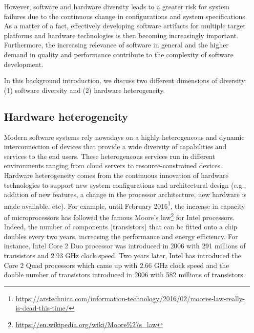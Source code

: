 However, software and hardware diversity leads to a greater risk for system failures due to the continuous change in configurations and system specifications.
As a matter of a fact, effectively developing software artifacts for multiple target platforms and hardware technologies is then becoming increasingly important.
Furthermore, the increasing relevance of software in general and the higher demand in quality and performance contribute to the complexity of software development.

In this background introduction, we discuss two different dimensions of diversity: (1) software diversity and (2) hardware heterogeneity.

 
 
\subsection{Hardware heterogeneity}
Modern software systems rely nowadays on a highly heterogeneous and dynamic interconnection of devices that provide a wide diversity of capabilities and services to the end users.
These heterogeneous services run in different environments ranging from cloud servers to resource-constrained devices.
Hardware heterogeneity comes from the continuous innovation of hardware technologies to support new system configurations and architectural design (e.g., addition of new features, a change in the processor architecture, new hardware is made available, etc). 
For example, until February 2016\footnote{\url{https://arstechnica.com/information-technology/2016/02/moores-law-really-is-dead-this-time/}}, the increase in capacity of microprocessors has followed the famous Moore's law\footnote{\url{https://en.wikipedia.org/wiki/Moore\%27s_law}} for Intel processors. Indeed, the number of components (transistors) that can be fitted onto a chip doubles every two years, increasing the performance and energy efficiency.
For instance, Intel Core 2 Duo processor was introduced in 2006 with 291 millions of transistors and 2.93 GHz clock speed. Two years later, Intel has introduced the Core 2 Quad processors which came up with 2.66 GHz clock speed and the double number of transistors introduced in 2006 with 582 millions of transistors.

